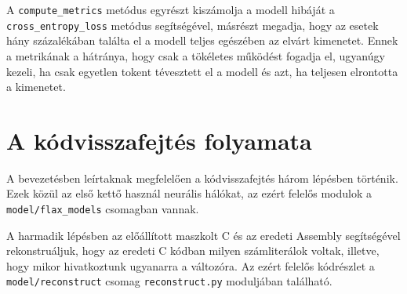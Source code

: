 A \texttt{compute\_metrics} metódus egyrészt kiszámolja a modell hibáját a \texttt{cross\_entropy\_loss}
metódus segítségével, másrészt megadja, hogy az esetek hány százalékában találta el a modell teljes
egészében az elvárt kimenetet. Ennek a metrikának a hátránya, hogy csak a tökéletes működést fogadja el,
ugyanúgy kezeli, ha csak egyetlen tokent tévesztett el a modell és azt, ha teljesen elrontotta a kimenetet.

\section{A kódvisszafejtés folyamata}
    A bevezetésben leírtaknak megfelelően a kódvisszafejtés három lépésben történik. Ezek közül
    az első kettő használ neurális hálókat, az ezért felelős modulok a \texttt{model/flax\_models}
    csomagban vannak.
    
    A harmadik lépésben az előállított maszkolt C és az eredeti Assembly segítségével rekonstruáljuk,
    hogy az eredeti C kódban milyen számliterálok voltak, illetve, hogy mikor hivatkoztunk ugyanarra
    a változóra. Az ezért felelős kódrészlet a \texttt{model/reconstruct} csomag \texttt{reconstruct.py}
    moduljában található.

